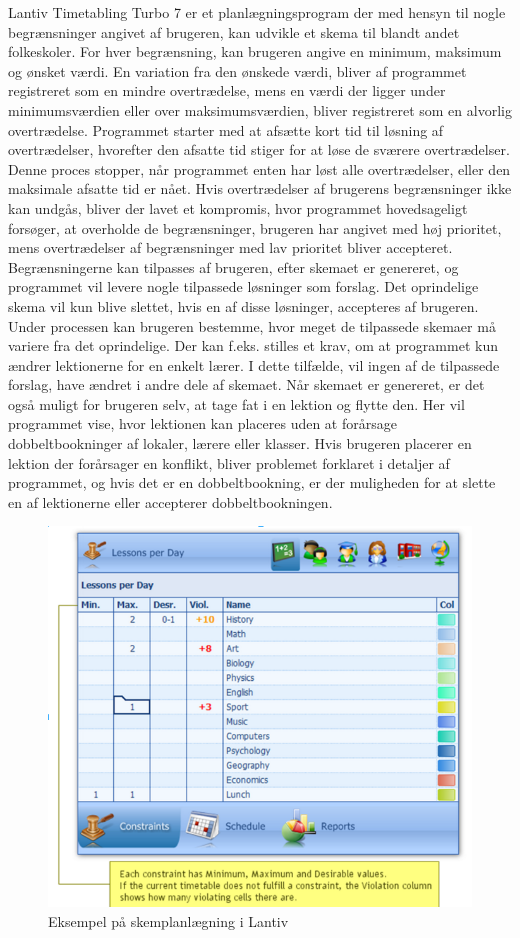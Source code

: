 Lantiv Timetabling Turbo 7 er et planlægningsprogram der med hensyn til nogle begrænsninger angivet af brugeren, kan udvikle et skema til blandt andet folkeskoler. For hver begrænsning, kan brugeren angive en minimum, maksimum og ønsket værdi. En variation fra den ønskede værdi, bliver af programmet registreret som en mindre overtrædelse, mens en værdi der ligger under minimumsværdien eller over maksimumsværdien, bliver registreret som en alvorlig overtrædelse. Programmet starter med at afsætte kort tid til løsning af overtrædelser, hvorefter den afsatte tid stiger for at løse de sværere overtrædelser. Denne proces stopper, når programmet enten har løst alle overtrædelser, eller den maksimale afsatte tid er nået. Hvis overtrædelser af brugerens begrænsninger ikke kan undgås, bliver der lavet et kompromis, hvor programmet hovedsageligt forsøger, at overholde de begrænsninger, brugeren har angivet med høj prioritet, mens overtrædelser af begrænsninger med lav prioritet bliver accepteret. Begrænsningerne kan tilpasses af brugeren, efter skemaet er genereret, og programmet vil levere nogle tilpassede løsninger som forslag. Det oprindelige skema vil kun blive slettet, hvis en af disse løsninger, accepteres af brugeren. Under processen kan brugeren bestemme, hvor meget de tilpassede skemaer må variere fra det oprindelige. Der kan f.eks. stilles et krav, om at programmet kun ændrer lektionerne for en enkelt lærer. I dette tilfælde, vil ingen af de tilpassede forslag, have ændret i andre dele af skemaet. Når skemaet er genereret, er det også muligt for brugeren selv, at tage fat i en lektion og flytte den. Her vil programmet vise, hvor lektionen kan placeres uden at forårsage dobbeltbookninger af lokaler, lærere eller klasser. Hvis brugeren placerer en lektion der forårsager en konflikt, bliver problemet forklaret i detaljer af programmet, og hvis det er en dobbeltbookning, er der muligheden for at slette en af lektionerne eller accepterer dobbeltbookningen.\cite{lantiv2016}
\begin{figure}[!h]
  \centering
  \includegraphics[width=\textwidth]{partials/graphics/LANTIV.png}
    \caption{Eksempel på skemplanlægning i Lantiv}
  \label{fig:lantiv}
\end{figure}

